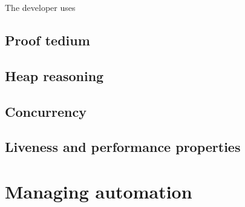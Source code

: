 The developer uses 

\subsection{Proof tedium}

\subsection{Heap reasoning}

\subsection{Concurrency}

\subsection{Liveness and performance properties}

\section{Managing automation}

